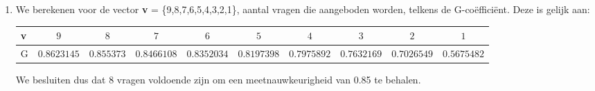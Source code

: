 {\begin{enumerate}
  We berekenen hiervoor eerst $\sigma^2_{rel.~meting}$
  \begin{align*}
    \sigma^2_{rel.~meting} 	&=  \dfrac{\hat{\sigma}^2_{sb}}{n_b} + \dfrac{\hat{\sigma}^2_{sv,svb,e}}{n_v*n_b} \\
                &=  \dfrac{{0.067}}{2} + \dfrac{{0.314 + 0.224}}{10*2}\\
                &= 0.0335 + 0.0269 \\
                &= 0.0604
  \end{align*}
  Bijgevolg kan $G$ opgesteld worden door $\sigma^2_{rel.~meting}$ en $\hat{\sigma}^2_{s}$ in te vullen in vergelijking \ref{eq.G1}:
  \begin{align*}
    G 	&=\dfrac{0.397}{0.397 + 0.0604}\\
      &=0.87
  \end{align*}
\item We berekenen voor de vector \textbf{v} = \{9,8,7,6,5,4,3,2,1\}, aantal vragen die aangeboden worden, telkens de G-co\"{e}ffici\"{e}nt. Deze is gelijk aan:

\begin{center}
\renewcommand{\arraystretch}{1.2}
\hspace*{-3 cm}
\begin{tabular}{|l|c|c|c|c|c|c|c|c|c|} \hline
 \textbf{v} & $ 9 $ & $ 8 $& $ 7 $ & $ 6 $ & $ 5 $ & $ 4 $ & $ 3 $ & $ 2 $ & $ 1 $ \\ \hline
G  & 0.$8623145$ & $0.855373$ & $0.8466108$ & $0.8352034$ & $0.8197398$ & $0.7975892$ & $0.7632169$ & $0.7026549$ & $0.5675482$ \\ \hline
\end{tabular}
\end{center}
We besluiten dus dat 8 vragen voldoende zijn om een meetnauwkeurigheid van 0.85 te behalen.
\end{enumerate}
}

\newpage

